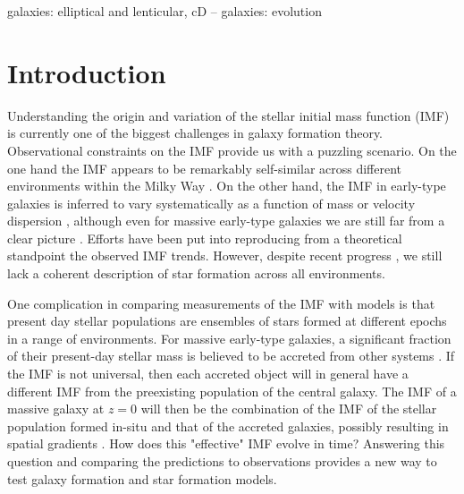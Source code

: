 \documentclass[usenatbib, letters]{mnras}
\begin{document}
\begin{keywords}
   galaxies: elliptical and lenticular, cD -- galaxies: evolution
\end{keywords}

\section{Introduction}\label{sect:intro}

Understanding the origin and variation of the stellar initial mass function (IMF) is currently one of the biggest challenges in galaxy formation theory.
Observational constraints on the IMF provide us with a puzzling scenario. On the one hand the IMF appears to be remarkably self-similar across different environments within the Milky Way \citep[see e.g.][]{BCM10, Off15}. On the other hand, the IMF in early-type galaxies is inferred to vary systematically as a function of mass or velocity dispersion \citep{Tre++10,Cap++12,CvD12, Dut++12, TRN13, Spi++14, Pos++15}, although even for massive early-type galaxies we are still far from a clear picture \citep{SLC15}. 
Efforts have been put into reproducing from a theoretical standpoint the observed IMF trends. However, despite recent progress \citep{H+C11,Kru11,Hop12,GKH15}, we still lack a coherent description of star formation across all environments.

One complication in comparing measurements of the IMF with models is that present day stellar populations are ensembles of stars formed at different epochs in a range of environments.
For massive early-type galaxies, a significant fraction of their present-day stellar mass is believed to be accreted from other systems \citep[e.g.][]{vDo++10}.
If the IMF is not universal, then each accreted object will in general have a different IMF from the preexisting population of the central galaxy.
The IMF of a massive galaxy at $z=0$ will then be the combination of the IMF of the stellar population formed in-situ and that of the accreted galaxies, possibly resulting in spatial gradients \citep{Mar++15, LaB++16}.
How does this "effective" IMF evolve in time?
Answering this question and comparing the predictions to observations provides a new way to test galaxy formation and star formation models.
\end{document}
